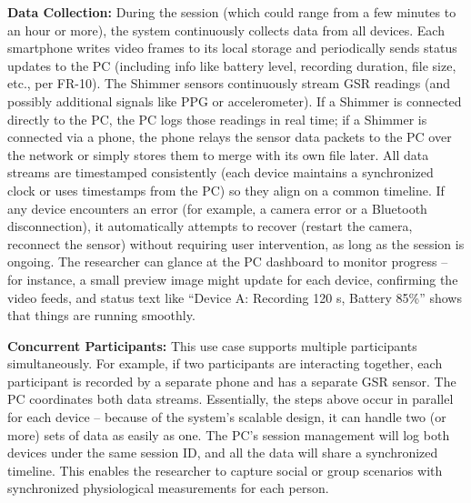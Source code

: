 \textbf{Data Collection:} During the session (which could range from a few minutes to an hour or more), the system continuously collects data from all devices. Each smartphone writes video frames to its local storage and periodically sends status updates to the PC (including info like battery level, recording duration, file size, etc., per FR-10). The Shimmer sensors continuously stream GSR readings (and possibly additional signals like PPG or accelerometer). If a Shimmer is connected directly to the PC, the PC logs those readings in real time; if a Shimmer is connected via a phone, the phone relays the sensor data packets to the PC over the network or simply stores them to merge with its own file later. All data streams are timestamped consistently (each device maintains a synchronized clock or uses timestamps from the PC) so they align on a common timeline. If any device encounters an error (for example, a camera error or a Bluetooth disconnection), it automatically attempts to recover (restart the camera, reconnect the sensor) without requiring user intervention, as long as the session is ongoing. The researcher can glance at the PC dashboard to monitor progress -- for instance, a small preview image might update for each device, confirming the video feeds, and status text like ``Device A: Recording 120 s, Battery 85\%'' shows that things are running smoothly.

\textbf{Concurrent Participants:} This use case supports multiple participants simultaneously. For example, if two participants are interacting together, each participant is recorded by a separate phone and has a separate GSR sensor. The PC coordinates both data streams. Essentially, the steps above occur in parallel for each device -- because of the system's scalable design, it can handle two (or more) sets of data as easily as one. The PC's session management will log both devices under the same session ID, and all the data will share a synchronized timeline. This enables the researcher to capture social or group scenarios with synchronized physiological measurements for each person.

